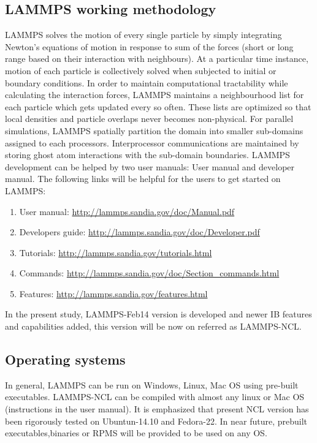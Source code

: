 \documentclass[11pt,a4paper,openright]{article}
\begin{document}
\subsection{LAMMPS working methodology}
LAMMPS solves the motion of every single particle by simply integrating Newton's equations of motion in response to sum of the forces (short or long range based on their interaction with neighbours). At a particular time instance, motion of each particle is collectively solved when subjected to initial or boundary conditions. In order to maintain computational tractability while calculating the interaction forces, LAMMPS maintains a neighbourhood list for each particle which gets updated every so often. These lists are optimized so that local densities and particle overlaps never becomes non-physical. For parallel simulations, LAMMPS spatially partition the domain into smaller sub-domains assigned to each processors. Interprocessor communications are maintained by storing ghost atom interactions with the sub-domain boundaries. LAMMPS development can be helped by two user manuals: User manual and developer manual. The following links will be helpful for the users to get started on LAMMPS:

\begin{enumerate}
\item User manual: \url{http://lammps.sandia.gov/doc/Manual.pdf}
\item Developers guide: \url{http://lammps.sandia.gov/doc/Developer.pdf}
\item Tutorials: \url{http://lammps.sandia.gov/tutorials.html}
\item Commands: \url{http://lammps.sandia.gov/doc/Section_commands.html}
\item Features: \url{http://lammps.sandia.gov/features.html}

\end{enumerate}

In the present study, LAMMPS-Feb14 version is developed and newer IB features and capabilities added, this version will be now on referred as LAMMPS-NCL. 

\subsection{Operating systems}
In general, LAMMPS can be run on Windows, Linux, Mac OS using pre-built executables. LAMMPS-NCL can be compiled with almost any linux or Mac OS (instructions in the user manual). It is emphasized that present NCL version has been rigorously tested on Ubuntun-14.10 and Fedora-22. In near future, prebuilt executables,binaries or RPMS will be provided to be used on any OS.
\end{document}
